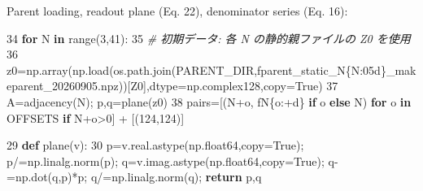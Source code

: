 \documentclass[
  a4paper,
]{ltjsarticle}
\newenvironment{Shaded}{}{}
\newcommand{\BuiltInTok}[1]{\textcolor[rgb]{0.00,0.50,0.00}{#1}}
\newcommand{\CommentTok}[1]{\textcolor[rgb]{0.38,0.63,0.69}{\textit{#1}}}
\newcommand{\ControlFlowTok}[1]{\textcolor[rgb]{0.00,0.44,0.13}{\textbf{#1}}}
\newcommand{\DecValTok}[1]{\textcolor[rgb]{0.25,0.63,0.44}{#1}}
\newcommand{\KeywordTok}[1]{\textcolor[rgb]{0.00,0.44,0.13}{\textbf{#1}}}
\newcommand{\NormalTok}[1]{#1}
\newcommand{\OperatorTok}[1]{\textcolor[rgb]{0.40,0.40,0.40}{#1}}
\newcommand{\SpecialCharTok}[1]{\textcolor[rgb]{0.25,0.44,0.63}{#1}}
\newcommand{\SpecialStringTok}[1]{\textcolor[rgb]{0.73,0.40,0.53}{#1}}
\newcommand{\StringTok}[1]{\textcolor[rgb]{0.25,0.44,0.63}{#1}}
\newcommand{\VariableTok}[1]{\textcolor[rgb]{0.10,0.09,0.49}{#1}}
\begin{document}
Parent loading, readout plane (Eq. 22), denominator series (Eq. 16):

\begin{Shaded}
\begin{Highlighting}[]
    \DecValTok{34}  \ControlFlowTok{for}\NormalTok{ N }\KeywordTok{in} \BuiltInTok{range}\NormalTok{(}\DecValTok{3}\NormalTok{,}\DecValTok{41}\NormalTok{):}
    \DecValTok{35}      \CommentTok{\# 初期データ: 各 N の静的親ファイルの Z0 を使用}
    \DecValTok{36}\NormalTok{      z0}\OperatorTok{=}\NormalTok{np.array(np.load(os.path.join(PARENT\_DIR,}\SpecialStringTok{f\textquotesingle{}parent\_static\_N}\SpecialCharTok{\{}\NormalTok{N}\SpecialCharTok{:05d\}}\SpecialStringTok{\_makeparent\_20260905.npz\textquotesingle{}}\NormalTok{))[}\StringTok{\textquotesingle{}Z0\textquotesingle{}}\NormalTok{],dtype}\OperatorTok{=}\NormalTok{np.complex128,copy}\OperatorTok{=}\VariableTok{True}\NormalTok{)}
    \DecValTok{37}\NormalTok{      A}\OperatorTok{=}\NormalTok{adjacency(N)}\OperatorTok{;}\NormalTok{ p,q}\OperatorTok{=}\NormalTok{plane(z0)}
    \DecValTok{38}\NormalTok{      pairs}\OperatorTok{=}\NormalTok{[(N}\OperatorTok{+}\NormalTok{o, }\SpecialStringTok{f\textquotesingle{}N}\SpecialCharTok{\{}\NormalTok{o}\SpecialCharTok{:+d\}}\SpecialStringTok{\textquotesingle{}} \ControlFlowTok{if}\NormalTok{ o }\ControlFlowTok{else} \StringTok{\textquotesingle{}N\textquotesingle{}}\NormalTok{) }\ControlFlowTok{for}\NormalTok{ o }\KeywordTok{in}\NormalTok{ OFFSETS }\ControlFlowTok{if}\NormalTok{ N}\OperatorTok{+}\NormalTok{o}\OperatorTok{\textgreater{}}\DecValTok{0}\NormalTok{] }\OperatorTok{+}\NormalTok{ [(}\DecValTok{124}\NormalTok{,}\StringTok{\textquotesingle{}124\textquotesingle{}}\NormalTok{)]}
\end{Highlighting}
\end{Shaded}

\begin{Shaded}
\begin{Highlighting}[]
    \DecValTok{29}  \KeywordTok{def}\NormalTok{ plane(v):}
    \DecValTok{30}\NormalTok{      p}\OperatorTok{=}\NormalTok{v.real.astype(np.float64,copy}\OperatorTok{=}\VariableTok{True}\NormalTok{)}\OperatorTok{;}\NormalTok{ p}\OperatorTok{/=}\NormalTok{np.linalg.norm(p)}\OperatorTok{;}\NormalTok{ q}\OperatorTok{=}\NormalTok{v.imag.astype(np.float64,copy}\OperatorTok{=}\VariableTok{True}\NormalTok{)}\OperatorTok{;}\NormalTok{ q}\OperatorTok{{-}=}\NormalTok{np.dot(q,p)}\OperatorTok{*}\NormalTok{p}\OperatorTok{;}\NormalTok{ q}\OperatorTok{/=}\NormalTok{np.linalg.norm(q)}\OperatorTok{;} \ControlFlowTok{return}\NormalTok{ p,q}
\end{Highlighting}
\end{Shaded}
\end{document}
